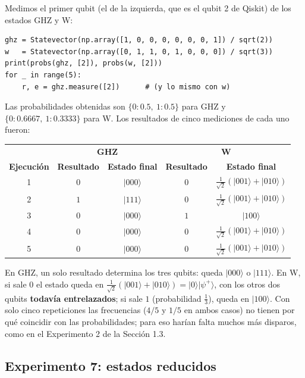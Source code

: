 \documentclass[11pt, a4paper, twoside, openright]{report}
\begin{document}
\noindent Medimos el primer qubit (el de la izquierda, que es el qubit 2 de Qiskit) de los estados GHZ y W:
\begin{lstlisting}
ghz = Statevector(np.array([1, 0, 0, 0, 0, 0, 0, 1]) / sqrt(2))
w   = Statevector(np.array([0, 1, 1, 0, 1, 0, 0, 0]) / sqrt(3))
print(probs(ghz, [2]), probs(w, [2]))
for _ in range(5):
    r, e = ghz.measure([2])      # (y lo mismo con w)
\end{lstlisting}
\noindent Las probabilidades obtenidas son $\{0: 0.5,\ 1: 0.5\}$ para GHZ y $\{0: 0.6667,\ 1: 0.3333\}$ para W. Los resultados de cinco mediciones de cada uno fueron:
\begin{center}
\small\renewcommand{\arraystretch}{1.2}
\begin{tabular}{c|c|c||c|c}
& \multicolumn{2}{c||}{\textbf{GHZ}} & \multicolumn{2}{c}{\textbf{W}} \\
\textbf{Ejecución} & \textbf{Resultado} & \textbf{Estado final} & \textbf{Resultado} & \textbf{Estado final} \\ \hline
1 & $0$ & $|000\rangle$ & $0$ & $\frac{1}{\sqrt2}(|001\rangle + |010\rangle)$ \\
2 & $1$ & $|111\rangle$ & $0$ & $\frac{1}{\sqrt2}(|001\rangle + |010\rangle)$ \\
3 & $0$ & $|000\rangle$ & $1$ & $|100\rangle$ \\
4 & $0$ & $|000\rangle$ & $0$ & $\frac{1}{\sqrt2}(|001\rangle + |010\rangle)$ \\
5 & $0$ & $|000\rangle$ & $0$ & $\frac{1}{\sqrt2}(|001\rangle + |010\rangle)$
\end{tabular}
\end{center}
\noindent En GHZ, un solo resultado determina los tres qubits: queda $|000\rangle$ o $|111\rangle$. En W, si sale $0$ el estado queda en $\frac{1}{\sqrt2}(|001\rangle + |010\rangle) = |0\rangle|\psi^+\rangle$, con los otros dos qubits \textbf{todavía entrelazados}; si sale $1$ (probabilidad $\frac13$), queda en $|100\rangle$. Con solo cinco repeticiones las frecuencias ($4/5$ y $1/5$ en ambos casos) no tienen por qué coincidir con las probabilidades; para eso harían falta muchos más disparos, como en el Experimento 2 de la Sección 1.3.

\subsection{Experimento 7: estados reducidos}
\end{document}
